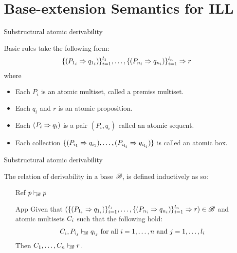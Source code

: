 \documentclass{beamer}
\begin{document}
\section{Base-extension Semantics for ILL}
\begin{frame}{Substructural atomic derivability}
\begin{definition}
Basic rules take the following form: 
\[\openaddrule (\at{P}_{1_i} \seq \at{q}_{1_i})\closeaddrule^{l_1}_{i=1}, \dots, \openaddrule (\at{P}_{n_i} \seq \at{q}_{n_i})\closeaddrule^{l_n}_{i=1} \Rightarrow \at{r}\]
where 
\begin{itemize}
\item Each $P_i$ is an atomic multiset, called a premiss multiset.
\item Each $q_i$ and $r$ is an atomic proposition.
\item Each $(P_i \seq q_i)$ is a pair $(P_i, q_i)$ called an atomic sequent.
\item Each collection $\openaddrule (\at{P}_{i_1} \seq \at{q}_{i_1}), \dots, (\at{P}_{i_{l_i}} \seq \at{q}_{i_{l_i}})\closeaddrule$ is called an atomic box.
    \end{itemize}
\end{definition}
\end{frame}
\begin{frame}{Substructural atomic derivability}
\begin{definition}
The relation of derivability in a base $\baseB$, is defined inductively as so:
\begin{itemize}
\item[Ref] $p \deriveBaseM{\baseB} p$
\item[App] Given that $(\openaddrule(\at{P}_{1_i} \seq \at{q}_{1_{i}})\Closeaddrule{i=1}{l_1},\dots,\openaddrule(\at{P}_{n_i} \seq \at{q}_{n_{i}}) \Closeaddrule{i=1}{l_n} \Rightarrow \at{r}) \in \baseB$ and atomic multisets $\at{C}_i$ such that the following hold:
        \[\at{C}_i, \at{P}_{i_j} \deriveBaseM{\baseB} \at{q}_{i_j} \text{ for all } i = 1,\dots, n \text{ and } j = 1,\dots,l_i\]
Then $\at{C}_{1},\dots,\at{C}_{n}\deriveBaseM{\baseB} r$. 
\end{itemize}
\end{definition}
\end{frame}
\end{document}
